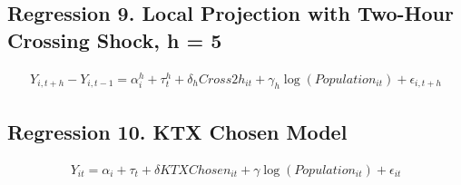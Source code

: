 \documentclass[a4paper, 10pt]{article}
\begin{document}
\begin{table}[H]
\centering
\caption{Regression 9. Local Projection with Two-Hour Crossing Shock, h = 4: 의사}

\end{table}

\subsection{Regression 9. Local Projection with Two-Hour Crossing Shock, h = 5}
\begin{align*}
    Y_{i,t+h}-Y_{i,t-1}=\alpha_i^h+\tau_t^h+\delta_h Cross2h_{it}+\gamma_h\log(Population_{it})+\epsilon_{i,t+h}
\end{align*}
\begin{table}[H]
\centering
\caption{Regression 9. Local Projection with Two-Hour Crossing Shock, h = 5: 의원}

\end{table}

\begin{table}[H]
\centering
\caption{Regression 9. Local Projection with Two-Hour Crossing Shock, h = 5: 병원}

\end{table}

\begin{table}[H]
\centering
\caption{Regression 9. Local Projection with Two-Hour Crossing Shock, h = 5: 종합병원}

\end{table}

\begin{table}[H]
\centering
\caption{Regression 9. Local Projection with Two-Hour Crossing Shock, h = 5: 상급종합병원}

\end{table}

\begin{table}[H]
\centering
\caption{Regression 9. Local Projection with Two-Hour Crossing Shock, h = 5: 의사}

\end{table}

\subsection{Regression 10. KTX Chosen Model}
\begin{align*}
    Y_{it}=\alpha_i+\tau_t+\delta KTXChosen_{it}+\gamma\log(Population_{it})+\epsilon_{it}
\end{align*}
\begin{table}[H]
\centering
\caption{Regression 10. KTX Chosen Model: 의원}

\end{table}
\end{document}
